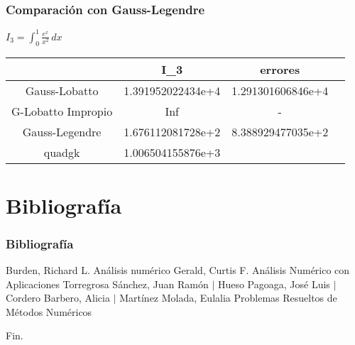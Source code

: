 \documentclass{beamer}
\begin{document}

\begin{frame}
\frametitle{Comparación con Gauss-Legendre}
\(\displaystyle I_3=\int_{0}^{1} \! \frac{e^x}{x^2}  \,dx\)

\begin{table}[h]

    \begin{tabular}{|c|c|c|c|}
        \hline
        \rowcolor{gray!30} %
         & I_3 & errores\\
        \hline
         Gauss-Lobatto &  1.391952022434e+4 & 1.291301606846e+4\\
        \hline
         G-Lobatto Impropio & Inf & -\\
        \hline
        Gauss-Legendre &  1.676112081728e+2 & 8.388929477035e+2\\
        \hline
        quadgk & 1.006504155876e+3 &\\
        \hline
    \end{tabular}

    \label{tab:my_label}
\end{table}
\end{frame}




\section{Bibliografía}
\begin{frame}
\frametitle{Bibliografía}
\footnotesize{
  \begin{thebibliography}{99} %
     Burden, Richard L.
      \newblock Análisis numérico
     Gerald, Curtis F.
      \newblock Análisis Numérico con Aplicaciones
     Torregrosa Sánchez, Juan Ramón $\vert$ Hueso Pagoaga, José Luis $\vert$ Cordero Barbero, Alicia $\vert$ Martínez Molada, Eulalia
      \newblock Problemas Resueltos de Métodos Numéricos
  \end{thebibliography}
}
\end{frame}


\begin{frame}
\Huge{\centerline{Fin.}}
\end{frame}

\end{document}
